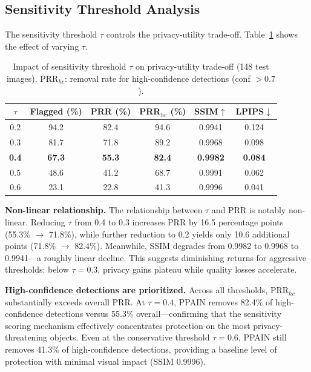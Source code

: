 \documentclass[preprint,12pt]{elsarticle}
\begin{document}
\subsection{Sensitivity Threshold Analysis}
\label{sec:sensitivity}

The sensitivity threshold $\tau$ controls the privacy-utility trade-off. Table~\ref{tab:threshold} shows the effect of varying $\tau$.

\begin{table}[t]
\centering
\caption{Impact of sensitivity threshold $\tau$ on privacy-utility trade-off (148 test images). PRR$_{hc}$: removal rate for high-confidence detections (conf $>0.7$).}
\label{tab:threshold}
\begin{tabular}{cccccc}
\toprule
$\tau$ & \textbf{Flagged (\%)} & \textbf{PRR (\%)} & \textbf{PRR$_{hc}$ (\%)} & \textbf{SSIM}$\uparrow$ & \textbf{LPIPS}$\downarrow$ \\
\midrule
0.2 & 94.2 & 82.4 & 94.6 & 0.9941 & 0.124 \\
0.3 & 81.7 & 71.8 & 89.2 & 0.9968 & 0.098 \\
\textbf{0.4} & \textbf{67.3} & \textbf{55.3} & \textbf{82.4} & \textbf{0.9982} & \textbf{0.084} \\
0.5 & 48.6 & 41.2 & 68.7 & 0.9991 & 0.062 \\
0.6 & 23.1 & 22.8 & 41.3 & 0.9996 & 0.041 \\
\bottomrule
\end{tabular}
\end{table}

\textbf{Non-linear relationship.} The relationship between $\tau$ and PRR is notably non-linear. Reducing $\tau$ from 0.4 to 0.3 increases PRR by 16.5 percentage points (55.3\% $\to$ 71.8\%), while further reduction to 0.2 yields only 10.6 additional points (71.8\% $\to$ 82.4\%). Meanwhile, SSIM degrades from 0.9982 to 0.9968 to 0.9941---a roughly linear decline. This suggests diminishing returns for aggressive thresholds: below $\tau = 0.3$, privacy gains plateau while quality losses accelerate.

\textbf{High-confidence detections are prioritized.} Across all thresholds, PRR$_{hc}$ substantially exceeds overall PRR. At $\tau = 0.4$, PPAIN removes 82.4\% of high-confidence detections versus 55.3\% overall---confirming that the sensitivity scoring mechanism effectively concentrates protection on the most privacy-threatening objects. Even at the conservative threshold $\tau = 0.6$, PPAIN still removes 41.3\% of high-confidence detections, providing a baseline level of protection with minimal visual impact (SSIM 0.9996).
\end{document}
